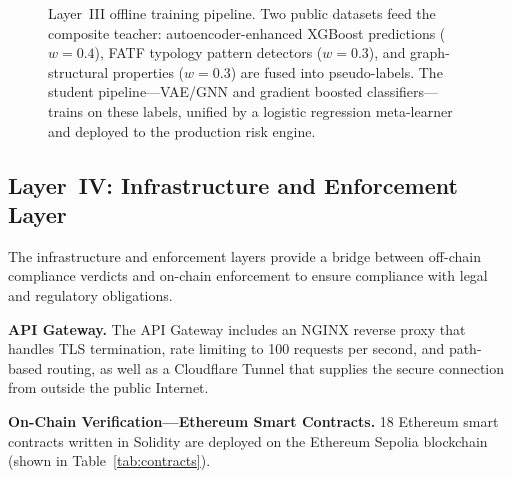 \documentclass[journal]{IEEEtran}
\begin{document}
\begin{figure}[!t]
{%
}%
\caption{Layer~III offline training pipeline. Two public datasets feed the composite teacher: autoencoder-enhanced XGBoost predictions ($w{=}0.4$), FATF typology pattern detectors ($w{=}0.3$), and graph-structural properties ($w{=}0.3$) are fused into pseudo-labels. The student pipeline---VAE/GNN and gradient boosted classifiers---trains on these labels, unified by a logistic regression meta-learner and deployed to the production risk engine.}
\label{fig:pipeline}
\end{figure}

\subsection{Layer~IV: Infrastructure and Enforcement Layer}

The infrastructure and enforcement layers provide a bridge between off-chain compliance verdicts and on-chain enforcement to ensure compliance with legal and regulatory obligations.

\textbf{API Gateway.} The API Gateway includes an NGINX reverse proxy that handles TLS termination, rate limiting to 100 requests per second, and path-based routing, as well as a Cloudflare Tunnel that supplies the secure connection from outside the public Internet.

\textbf{On-Chain Verification---Ethereum Smart Contracts.} 18 Ethereum smart contracts written in Solidity are deployed on the Ethereum Sepolia blockchain (shown in Table~\ref{tab:contracts}).
\end{document}
